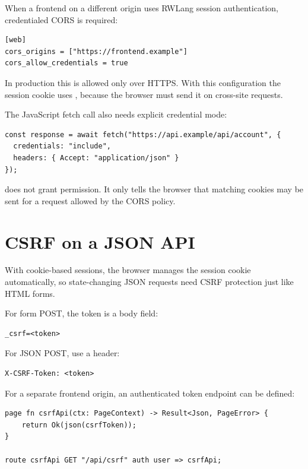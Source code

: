 When a frontend on a different origin uses RWLang session authentication, credentialed CORS is required:

\begin{lstlisting}
[web]
cors_origins = ["https://frontend.example"]
cors_allow_credentials = true
\end{lstlisting}

In production this is allowed only over HTTPS. With this configuration the session cookie uses , because the browser must send it on cross-site requests.

The JavaScript fetch call also needs explicit credential mode:

\begin{lstlisting}
const response = await fetch("https://api.example/api/account", {
  credentials: "include",
  headers: { Accept: "application/json" }
});
\end{lstlisting}

 does not grant permission. It only tells the browser that matching cookies may be sent for a request allowed by the CORS policy.

\section{CSRF on a JSON API}

With cookie-based sessions, the browser manages the session cookie automatically, so state-changing JSON requests need CSRF protection just like HTML forms.

For form POST, the token is a body field:

\begin{lstlisting}
_csrf=<token>
\end{lstlisting}

For JSON POST, use a header:

\begin{lstlisting}
X-CSRF-Token: <token>
\end{lstlisting}

For a separate frontend origin, an authenticated token endpoint can be defined:

\begin{lstlisting}[language=RWLang]
page fn csrfApi(ctx: PageContext) -> Result<Json, PageError> {
    return Ok(json(csrfToken));
}

route csrfApi GET "/api/csrf" auth user => csrfApi;
\end{lstlisting}

